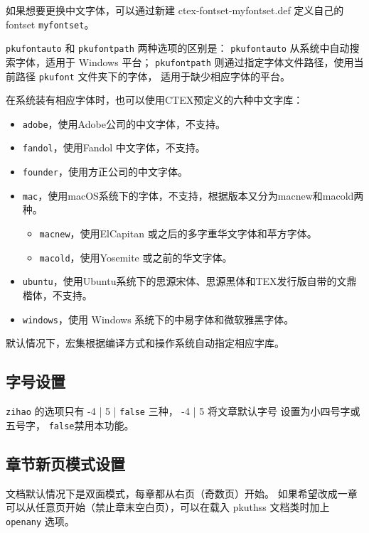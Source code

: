 如果想要更换中文字体，可以通过新建 ctex-fontset-myfontset.def 定义自己的 fontset \verb|myfontset|。

\texttt{pkufontauto} 和 \texttt{pkufontpath} 两种选项的区别是：
\texttt{pkufontauto} 从系统中自动搜索字体，适用于 Windows 平台；
\texttt{pkufontpath} 则通过指定字体文件路径，使用当前路径 \texttt{pkufont} 文件夹下的字体，
适用于缺少相应字体的平台。

在系统装有相应字体时，也可以使用CTEX预定义的六种中文字库：
\begin{itemize}
    \item \verb|adobe|，使用Adobe公司的中文字体，不支持。
    \item \verb|fandol|，使用Fandol 中文字体，不支持。
    \item \verb|founder|，使用方正公司的中文字体。
    \item \verb|mac|，使用macOS系统下的字体，不支持，根据版本又分为macnew和macold两种。
    \begin{itemize}
        \item \verb|macnew|，使用ElCapitan 或之后的多字重华文字体和苹方字体。
        \item \verb|macold|，使用Yosemite 或之前的华文字体。
    \end{itemize}
    \item \verb|ubuntu|，使用Ubuntu系统下的思源宋体、思源黑体和TEX发行版自带的文鼎楷体，不支持。
    \item \verb|windows|，使用 Windows 系统下的中易字体和微软雅黑字体。
\end{itemize}
默认情况下，\CTeX{}宏集根据编译方式和操作系统自动指定相应字库。

\subsection{字号设置}

\texttt{zihao} 的选项只有 -4 | 5 | \texttt{false} 三种，
-4 | 5 将文章默认字号 \texttt{\bfseries\string\normalsize}设置为小四号字或五号字，
\texttt{false}禁用本功能。

\subsection{章节新页模式设置}
文档默认情况下是双面模式，每章都从右页（奇数页）开始。
如果希望改成一章可以从任意页开始（禁止章末空白页），可以在载入 pkuthss 文档类时加上 \texttt{openany} 选项。

